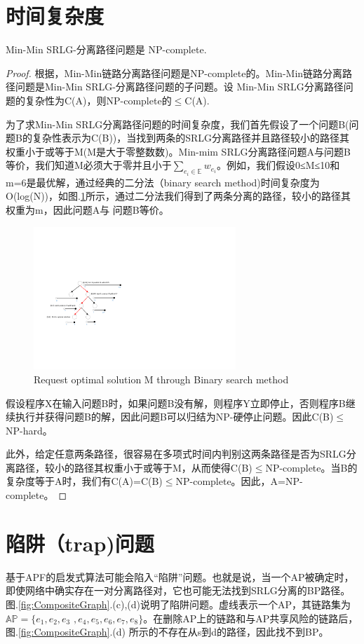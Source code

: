 \section{时间复杂度}
\begin{theorem}
\label{le:lemma1}
    Min-Min SRLG-分离路径问题是 NP-complete.
\end{theorem}
\begin{proof}
根据\cite{bhatia2006finding}，Min-Min链路分离路径问题是NP-complete的。Min-Min链路分离路径问题是Min-Min SRLG-分离路径问题的子问题。设
Min-Min SRLG分离路径问题的复杂性为C(A)，则NP-complete的$\leq$C(A).

为了求Min-Min SRLG分离路径问题的时间复杂度，我们首先假设了一个问题B(问题B的复杂性表示为C(B))，当找到两条的SRLG分离路径并且路径较小的路径其权重小于或等于M(M是大于零整数数)。Min-mim SRLG分离路径问题A与问题B等价，我们知道M必须大于零并且小于$\sum\limits_{e_i\in \mathbb{E}}w_{e_i}$。例如，我们假设0≤M≤10和m=6是最优解，通过经典的二分法（binary search method)时间复杂度为O(log(N))，如图.\ref{fig:binarySearch}所示，通过二分法我们得到了两条分离的路径，较小的路径其权重为m，因此问题A与 问题B等价。
\begin{figure}[tp]
  \centering
  \includegraphics[width=3.0in]{figures/binarySearch}
  \caption{Request optimal solution M through Binary search method }
  \label{fig:binarySearch}
\end{figure}
假设程序X在输入问题B时，如果问题B没有解，则程序Y立即停止，否则程序B继续执行并获得问题B的解，因此问题B可以归结为NP-硬停止问题。因此C(B)$\leq$NP-hard。

此外，给定任意两条路径，很容易在多项式时间内判别这两条路径是否为SRLG分离路径，较小的路径其权重小于或等于M，从而使得C(B)$\leq$NP-complete。当B的复杂度等于A时，我们有C(A)=C(B)$\leq$NP-complete。因此，A=NP-complete。  
\end{proof}
\section{陷阱（trap)问题}
基于APF的启发式算法可能会陷入“陷阱”问题。也就是说，当一个AP被确定时，即使网络中确实存在一对分离路径对，它也可能无法找到SRLG分离的BP路径。图.\ref{fig:CompositeGraph}.(c),(d)说明了陷阱问题。虚线表示一个AP，其链路集为$\mathbb{AP}=\{e_1,e_2,e_3$ $,e_4,e_5,e_6,e_7,e_8\}$。在删除AP上的链路和与AP共享风险的链路后，图.\ref{fig:CompositeGraph}.(d) 所示的不存在从s到d的路径，因此找不到BP。


